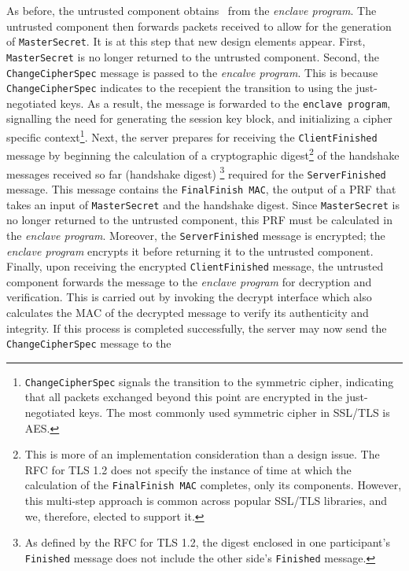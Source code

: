 \documentclass[../../main.tex]{subfiles}
\begin{document}
As before, the untrusted component obtains \srandom~from the
\textit{enclave program}. The untrusted component then forwards
packets received to allow for the generation of
\texttt{MasterSecret}. It is at this step that new design elements
appear. First, \texttt{MasterSecret} is no longer returned to the
untrusted component. Second, the \texttt{Change\-CipherSpec} message
is passed to the \textit{encalve program}. This is because
\texttt{ChangeCipherSpec} indicates to the recepient the transition to
using the just-negotiated keys. As a result, the message is forwarded
to the \texttt{enclave program}, signalling the need for generating
the session key block, and initializing a cipher specific
context\footnote{\texttt{ChangeCipherSpec} signals the transition to
  the symmetric cipher, indicating that all packets exchanged beyond
  this point are encrypted in the just-negotiated keys. The most
  commonly used symmetric cipher in SSL/TLS is AES.}. Next, the server
prepares for receiving the \texttt{ClientFinished} message by
beginning the calculation of a cryptographic digest\footnote{This is
  more of an implementation consideration than a design issue. The RFC
  for TLS 1.2 does not specify the instance of time at which the
  calculation of the \texttt{FinalFinish MAC} completes, only its
  components. However, this multi-step approach is common across
  popular SSL/TLS libraries, and we, therefore, elected to support
  it.} of the handshake messages received so far (handshake digest)
\footnote{As defined by the RFC for TLS 1.2, the digest enclosed in
  one participant's \texttt{Finished} message does not include the
  other side's \texttt{Finished} message.} required for the
\texttt{ServerFinished} message. This message contains the
\texttt{FinalFinish MAC}, the output of a PRF that takes an input of
\texttt{MasterSecret} and the handshake digest. Since
\texttt{MasterSecret} is no longer returned to the untrusted
component, this PRF must be calculated in the \textit{enclave
  program}. Moreover, the \texttt{ServerFinished} message is
encrypted; the \textit{enclave program} encrypts it before returning
it to the untrusted component. Finally, upon receiving the encrypted
\texttt{ClientFinished} message, the untrusted component forwards the
message to the \textit{enclave program} for decryption and
verification. This is carried out by invoking the decrypt interface
which also calculates the MAC of the decrypted message to verify its
authenticity and integrity. If this process is completed successfully,
the server may now send the \texttt{ChangeCipherSpec} message to the
\end{document}
